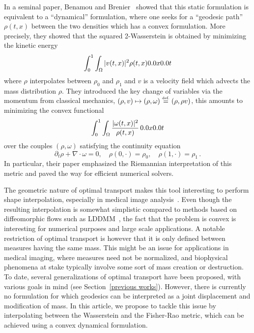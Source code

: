 In a seminal paper, Benamou and Brenier~\cite{benamou2000computational} showed that this static formulation is equivalent to a ``dynamical'' formulation, where one seeks for a ``geodesic path'' $\rho(t,x)$ between the two densities which has a convex formulation. More precisely, they showed that the squared 2-Wasserstein is obtained by minimizing the kinetic energy
\[
\int_0^1 \int_{\Omega} |v(t,x)|^2 \rho(t,x) \d x \d t
\]
where $\rho$ interpolates between $\rho_0$ and $\rho_1$ and $v$ is a velocity field which advects the mass distribution $\rho$. They introduced the key change of variables via the momentum from classical mechanics, $(\rho,v) \mapsto (\rho,\omega)\stackrel{\mbox{\upshape\tiny def.}}{=} (\rho,\rho v)$, this amounts to minimizing the convex functional
\begin{equation}\label{eq-dynamic}
 	\int_0^1 \int_{\Omega} \frac{|\omega(t,x)|^2}{\rho(t,x)} \,\d x \d t
\end{equation}
over the couples $(\rho,\omega)$ satisfying the continuity equation 
\begin{equation}\label{eq-continuity}
	\partial_t \rho + \nabla \cdot \omega =0, \quad \rho(0,\cdot) = \rho_0, \quad \rho(1,\cdot) = \rho_1\,.
\end{equation}
In particular, their paper emphasized the Riemannian interpretation of this metric and paved the way for efficient numerical solvers.

The geometric nature of optimal transport makes this tool interesting to perform shape interpolation, especially in medical image analysis~\cite{haker2004optimal}. Even though the resulting interpolation is somewhat simplistic compared to methods based on diffeomorphic flows such as LDDMM~\cite{beg2005computing}, the fact that the problem is convex is interesting for numerical purposes and large scale applications. 
%
A notable restriction of optimal transport is however that it is only defined between measures having the same mass. This might be an issue for applications in medical imaging, where measures need not be normalized, and biophysical phenomena at stake typically involve some sort of mass creation or destruction.
% 
To date, several generalizations of optimal transport have been proposed, with various goals in mind (see Section~\ref{previous works}). However, there is currently no formulation for which geodesics can be interpreted as a joint  displacement and modification of mass. In this article, we propose to tackle this issue by interpolating between the Wasserstein and the Fisher-Rao metric, which can be achieved using a convex dynamical formulation.


